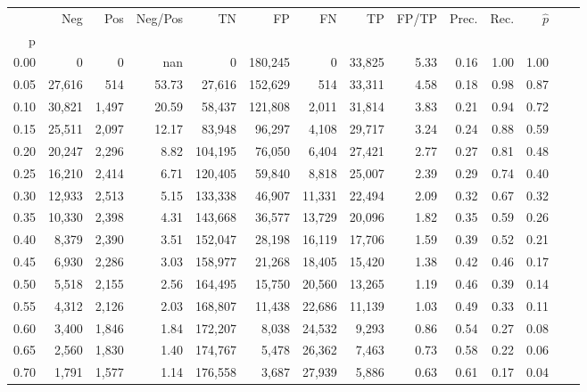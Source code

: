 \begin{tabular}{rrrrrrrrrrrrrr}
\toprule
{} &     Neg &    Pos & Neg/Pos &       TN &       FP &      FN &      TP & FP/TP & Prec. &  Rec. & $\hat{p}$ \\
p    &         &        &         &          &          &         &         &       &       &       &           \\
\midrule
0.00 &       0 &      0 &     nan &        0 &  180,245 &       0 &  33,825 &  5.33 &  0.16 &  1.00 &      1.00 \\
0.05 &  27,616 &    514 &   53.73 &   27,616 &  152,629 &     514 &  33,311 &  4.58 &  0.18 &  0.98 &      0.87 \\
0.10 &  30,821 &  1,497 &   20.59 &   58,437 &  121,808 &   2,011 &  31,814 &  3.83 &  0.21 &  0.94 &      0.72 \\
0.15 &  25,511 &  2,097 &   12.17 &   83,948 &   96,297 &   4,108 &  29,717 &  3.24 &  0.24 &  0.88 &      0.59 \\
0.20 &  20,247 &  2,296 &    8.82 &  104,195 &   76,050 &   6,404 &  27,421 &  2.77 &  0.27 &  0.81 &      0.48 \\
0.25 &  16,210 &  2,414 &    6.71 &  120,405 &   59,840 &   8,818 &  25,007 &  2.39 &  0.29 &  0.74 &      0.40 \\
0.30 &  12,933 &  2,513 &    5.15 &  133,338 &   46,907 &  11,331 &  22,494 &  2.09 &  0.32 &  0.67 &      0.32 \\
0.35 &  10,330 &  2,398 &    4.31 &  143,668 &   36,577 &  13,729 &  20,096 &  1.82 &  0.35 &  0.59 &      0.26 \\
0.40 &   8,379 &  2,390 &    3.51 &  152,047 &   28,198 &  16,119 &  17,706 &  1.59 &  0.39 &  0.52 &      0.21 \\
0.45 &   6,930 &  2,286 &    3.03 &  158,977 &   21,268 &  18,405 &  15,420 &  1.38 &  0.42 &  0.46 &      0.17 \\
0.50 &   5,518 &  2,155 &    2.56 &  164,495 &   15,750 &  20,560 &  13,265 &  1.19 &  0.46 &  0.39 &      0.14 \\
0.55 &   4,312 &  2,126 &    2.03 &  168,807 &   11,438 &  22,686 &  11,139 &  1.03 &  0.49 &  0.33 &      0.11 \\
0.60 &   3,400 &  1,846 &    1.84 &  172,207 &    8,038 &  24,532 &   9,293 &  0.86 &  0.54 &  0.27 &      0.08 \\
0.65 &   2,560 &  1,830 &    1.40 &  174,767 &    5,478 &  26,362 &   7,463 &  0.73 &  0.58 &  0.22 &      0.06 \\
0.70 &   1,791 &  1,577 &    1.14 &  176,558 &    3,687 &  27,939 &   5,886 &  0.63 &  0.61 &  0.17 &      0.04 \\

\end{tabular}
